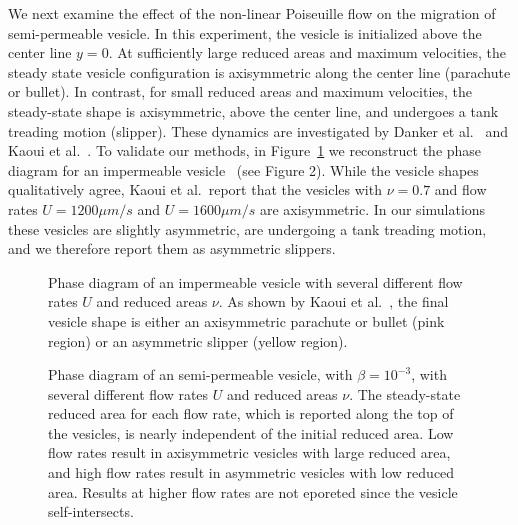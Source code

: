 \documentclass[9pt,twocolumn,twoside,lineno]{pnas-new}
\newif\ifTikz
\begin{document}
We next examine the effect of the non-linear Poiseuille flow on the
migration of semi-permeable vesicle. In this experiment, the vesicle is
initialized above the center line $y=0$. At sufficiently large reduced
areas and maximum velocities, the steady state vesicle configuration is
axisymmetric along the center line (parachute or bullet). In contrast,
for small reduced areas and maximum velocities, the steady-state shape
is axisymmetric, above the center line, and undergoes a tank treading
motion (slipper). These dynamics are investigated by Danker et
al.~\cite{dan-vla-mis2009} and Kaoui et al.~\cite{kao-bir-mis2009}. To
validate our methods, in
Figure~\ref{fig:parabolicOffCenterImpermeablePhaseDiagram} we
reconstruct the phase diagram for an impermeable
vesicle~\cite{kao-bir-mis2009} (see Figure 2). While the vesicle shapes
qualitatively agree, Kaoui et al.~report that the vesicles with
$\nu=0.7$ and flow rates $U = 1200 \mu m/s$ and $U = 1600 \mu m/s$ are
axisymmetric. In our simulations these vesicles are slightly asymmetric,
are undergoing a tank treading motion, and we therefore report them as
asymmetric slippers.

\begin{figure}[htp]
  \ifTikz
  
  \fi
  \caption{\label{fig:parabolicOffCenterImpermeablePhaseDiagram} Phase
  diagram of an impermeable vesicle with several different flow rates
  $U$ and reduced areas $\nu$. As shown by Kaoui et
  al.~\cite{kao-bir-mis2009}, the final vesicle shape is either an
  axisymmetric parachute or bullet (pink region) or an asymmetric
  slipper (yellow region).}
\end{figure}

\begin{figure}[htp]
  \ifTikz
  
  \fi
  \caption{\label{fig:parabolicOffCenterSemipermeablePhaseDiagram} Phase
  diagram of an semi-permeable vesicle, with $\beta = 10^{-3}$, with
  several different flow rates $U$ and reduced areas $\nu$. The
  steady-state reduced area for each flow rate, which is reported along
  the top of the vesicles, is nearly independent of the initial reduced
  area. Low flow rates result in axisymmetric vesicles with large
  reduced area, and high flow rates result in asymmetric vesicles with
  low reduced area. Results at higher flow rates are not eporeted since
  the vesicle self-intersects.}
\end{figure}
\end{document}
